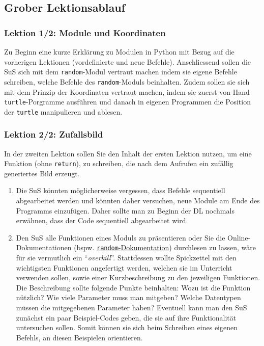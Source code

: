 \begin{myExBox}[title=DL \themycounter]
\subsection*{Grober Lektionsablauf}
\subsubsection*{Lektion 1/2: Module und Koordinaten}
Zu Beginn eine kurze Erklärung zu Modulen in Python mit Bezug auf die vorherigen Lektionen (vordefinierte und neue Befehle). Anschliessend sollen die SuS sich mit dem \lstinline|random|-Modul vertraut machen indem sie eigene Befehle schreiben, welche Befehle des \lstinline|random|-Moduls beinhalten. Zudem sollen sie sich mit dem Prinzip der Koordinaten vertraut machen, indem sie zuerst von Hand \lstinline|turtle|-Porgramme ausführen und danach in eigenen Programmen die Position der \lstinline|turtle| manipulieren und ablesen.

\subsubsection*{Lektion 2/2: Zufallsbild}
In der zweiten Lektion sollen Sie den Inhalt der ersten Lektion nutzen, um eine Funktion (ohne \lstinline|return|), zu schreiben, die nach dem Aufrufen ein zufällig generiertes Bild erzeugt.


\begin{myExBox}[title=Mögliche Schwierigkeiten \& geeignete Massnahmen]
\begin{enumerate}
    \item Die SuS könnten möglicherweise vergessen, dass Befehle sequentiell abgearbeitet werden und könnten daher versuchen, neue Module am Ende des Programms einzufügen. Daher sollte man zu Beginn der DL nochmals erwähnen, dass der Code sequentiell abgearbeitet wird.
    \item Den SuS alle Funktionen eines Moduls zu präsentieren oder Sie die Online-Dokumentationen (bspw. \href{https://docs.python.org/3/library/random.html}{\lstinline|random|-Dokumentation}) durchlesen zu lassen, wäre für sie vermutlich ein  \enquote{\textit{overkill}}. Stattdessen wollte Spickzettel mit den wichtigsten Funktionen angefertigt werden, welchen sie im Unterricht verwenden sollen, sowie einer Kurzbeschreibung zu den jeweiligen Funktionen. Die Beschreibung sollte folgende Punkte beinhalten: Wozu ist die Funktion nützlich? Wie viele Parameter muss man mitgeben? Welche Datentypen müssen die mitgegebenen Parameter haben? Eventuell kann man den SuS zunächst ein paar Beispiel-Codes geben, die sie auf ihre Funktionalität untersuchen sollen. Somit können sie sich beim Schreiben eines eigenen Befehls, an diesen Beispielen orientieren.
\end{enumerate}
\end{myExBox}
\end{myExBox}
\newpage{}


